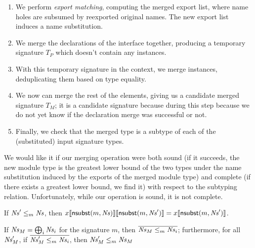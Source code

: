 \begin{enumerate}
    \item We perform \emph{export matching}, computing the merged
    export list, where name holes are subsumed by reexported original
    names. The new export list induces a name substitution.

    \item We merge the declarations of the interface together,
    producing a temporary signature $T_P$ which doesn't contain
    any instances.

    \item With this temporary signature in the context, we
    merge instances, deduplicating them based on type equality.

    \item We now can merge the rest of the elements, giving us
    a candidate merged signature $T_M$; it is a candidate signature
    because during this step because we do not yet know if the
    declaration merge was successful or not.

    \item Finally, we check that the merged type is a subtype of each of the
    (substituted) input signature types.
\end{enumerate}
%
We would like it if our merging operation were both sound (if it
succeeds, the new module type is the greatest lower bound of the two
types under the name substitution induced by the exports of the merged
module type) and complete (if there exists a greatest lower bound, we
find it) with respect to the subtyping relation.  Unfortunately,
while our operation is sound, it is not complete.

\begin{lemma}
\label{lem:absorb}
If $\mathit{Ns}' \le_m \mathit{Ns}$, then $x\llbracket\textsf{nsubst}(m, \mathit{Ns})\rrbracket\llbracket\textsf{nsubst}(m, \mathit{Ns}')\rrbracket = x\llbracket\textsf{nsubst}(m, \mathit{Ns}')\rrbracket$.
\end{lemma}

\begin{lemma}
\label{lem:export}
If $\mathit{Ns}_M = \bigoplus_i \mathit{Ns}_i$ for the signature $m$, then
$\overline{\mathit{Ns}_M \le_m \mathit{Ns}_i}$; furthermore,
for all $\mathit{Ns}'_M$, if
$\overline{\mathit{Ns}'_M \le_m \mathit{Ns}_i}$, then
$\mathit{Ns}'_M \le_m \mathit{Ns}_M$
\end{lemma}


